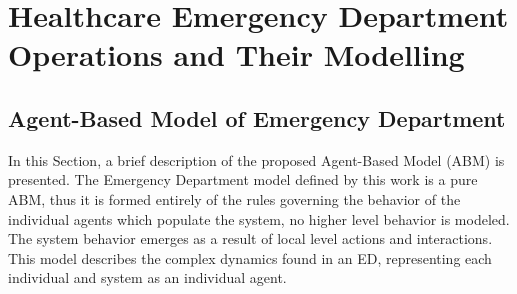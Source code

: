\documentclass[11pt]{article} %
\begin{document}
\section{Healthcare Emergency Department Operations and Their Modelling}
\label{sec:model}

\subsection{Agent-Based Model of Emergency Department}
\label{ssec:ed-mdl}

In this Section, a brief description of the proposed Agent-Based Model (ABM) is presented. The Emergency Department model defined by this work is a pure ABM, thus it is formed entirely of the rules governing the behavior of the individual agents which populate the system, no higher level behavior is modeled. The system behavior emerges as a result of local level actions and interactions. This model describes the complex dynamics found in an ED, representing each individual and system as an individual agent. 
\end{document}
